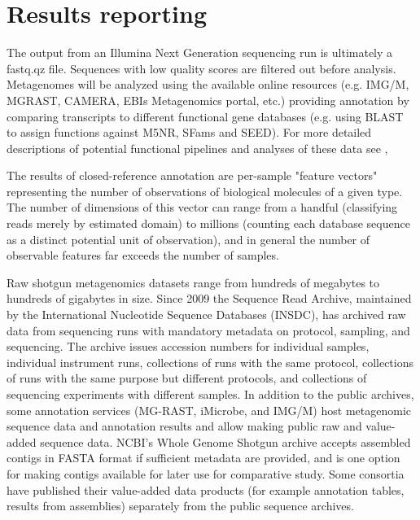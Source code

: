 \documentclass[graybox]{svmult}
\begin{document}
\section{Results reporting }
\label{sec:5}

The output from an Illumina Next Generation sequencing run is ultimately a fastq.qz file. Sequences with low quality scores are filtered out before analysis. Metagenomes will be analyzed using the available online resources (e.g. IMG/M, MGRAST, CAMERA, EBIs Metagenomics portal, etc.) providing annotation by comparing transcripts to different functional gene databases (e.g. using BLAST to assign functions against M5NR, SFams and SEED). For more detailed descriptions of potential functional pipelines and analyses of these data see \cite{Thomas2012Metagenomics}, \cite{Meyer2008Metagenomics} \cite{Wilke2015RESTful}

        The results of closed-reference annotation are per-sample "feature vectors" representing the number of observations of biological molecules of a given type.  The number of dimensions of this vector can range from a handful (classifying reads merely by estimated domain) to millions (counting each database sequence as a distinct potential unit of observation), and in general the number of observable features far exceeds the number of samples.

        Raw shotgun metagenomics datasets range from hundreds of megabytes to hundreds of gigabytes in size.  Since 2009 the Sequence Read Archive, maintained by the International Nucleotide Sequence Databases (INSDC), has archived raw data from sequencing runs with mandatory metadata on protocol, sampling, and sequencing.  The archive issues accession numbers for individual samples, individual instrument runs, collections of runs with the same protocol, collections of runs with the same purpose but different protocols, and collections of sequencing experiments with different samples.  
In addition to the public archives, some annotation services (MG-RAST, iMicrobe, and IMG/M) host metagenomic sequence data and annotation results and allow making public raw and value-added sequence data.    NCBI's Whole Genome Shotgun archive accepts assembled contigs in FASTA format if sufficient metadata are provided, and is one option for making contigs available for later use for comparative study.
Some consortia have published their value-added data products (for example annotation tables, results from assemblies) separately from the public sequence archives.
\end{document}
